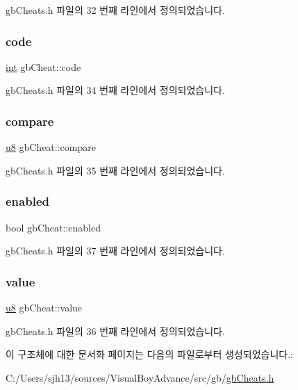 gb\+Cheats.\+h 파일의 32 번째 라인에서 정의되었습니다.

\mbox{\label{structgb_cheat_ab501c0fb95ea8338237734ec8e2fc981}} 
\subsubsection{\texorpdfstring{code}{code}}
{\footnotesize\ttfamily \mbox{\hyperlink{_util_8cpp_a0ef32aa8672df19503a49fab2d0c8071}{int}} gb\+Cheat\+::code}



gb\+Cheats.\+h 파일의 34 번째 라인에서 정의되었습니다.

\mbox{\label{structgb_cheat_aae5ac2290ab371e369b8c11789b5d7f9}} 
\subsubsection{\texorpdfstring{compare}{compare}}
{\footnotesize\ttfamily \mbox{\hyperlink{_system_8h_aed742c436da53c1080638ce6ef7d13de}{u8}} gb\+Cheat\+::compare}



gb\+Cheats.\+h 파일의 35 번째 라인에서 정의되었습니다.

\mbox{\label{structgb_cheat_af45ed85e44d6d20c3f0f9be2e2fd8c3b}} 
\subsubsection{\texorpdfstring{enabled}{enabled}}
{\footnotesize\ttfamily bool gb\+Cheat\+::enabled}



gb\+Cheats.\+h 파일의 37 번째 라인에서 정의되었습니다.

\mbox{\label{structgb_cheat_acabb64808f69357b955b5c9f464c9cc1}} 
\subsubsection{\texorpdfstring{value}{value}}
{\footnotesize\ttfamily \mbox{\hyperlink{_system_8h_aed742c436da53c1080638ce6ef7d13de}{u8}} gb\+Cheat\+::value}



gb\+Cheats.\+h 파일의 36 번째 라인에서 정의되었습니다.



이 구조체에 대한 문서화 페이지는 다음의 파일로부터 생성되었습니다.\+:\begin{DoxyCompactItemize}
\item 
C\+:/\+Users/sjh13/sources/\+Visual\+Boy\+Advance/src/gb/\mbox{\hyperlink{gb_cheats_8h}{gb\+Cheats.\+h}}\end{DoxyCompactItemize}
